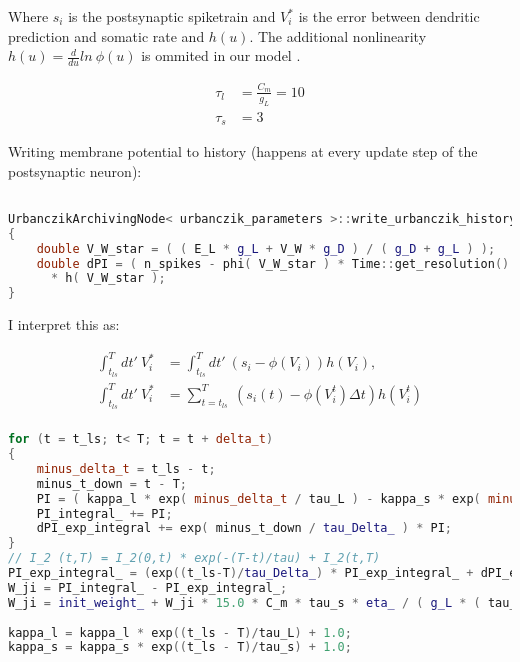 Where $s_i$ is the postsynaptic spiketrain and $V_i^*$ is the error between dendritic prediction and somatic rate and $h( u )$. The additional nonlinearity $h( u ) = \frac{d}{du} ln \  \phi(u)$ is ommited in our model .



\begin{align}
  \tau_l & = \frac{C_m}{g_L} = 10 \\
  \tau_s & = 3
\end{align}

Writing membrane potential to history (happens at every update step of the postsynaptic neuron):

\begin{lstlisting}[language=C++, directivestyle={\color{black}}
                   emph={int,char,double,float,unsigned,exp},
                   emphstyle={\color{blue}}]

UrbanczikArchivingNode< urbanczik_parameters >::write_urbanczik_history(Time t, double V_W, int n_spikes, int comp)
{
	double V_W_star = ( ( E_L * g_L + V_W * g_D ) / ( g_D + g_L ) );
	double dPI = ( n_spikes - phi( V_W_star ) * Time::get_resolution().get_ms() )
      * h( V_W_star );
}\end{lstlisting}

I interpret this as:


\begin{align}
  \int_{t_{ls}}^T dt' \ V_i^* & = \int_{t_{ls}}^T dt' \  (s_i - \phi(V_i )) h(V_i),               \\
  \int_{t_{ls}}^T dt' \ V_i^* & = \sum_{t=t_{ls}}^T \  (s_i(t) -  \phi(V_i^t ) \Delta t) h(V_i^t) \\
\end{align}

\begin{lstlisting}[language=C++, directivestyle={\color{black}}
                   emph={int,char,double,float,unsigned,exp},
                   emphstyle={\color{blue}}]
for (t = t_ls; t< T; t = t + delta_t)
{
   	minus_delta_t = t_ls - t;
    minus_t_down = t - T;
    PI = ( kappa_l * exp( minus_delta_t / tau_L ) - kappa_s * exp( minus_delta_t / tau_s ) ) * V_star(t);
    PI_integral_ += PI;
    dPI_exp_integral += exp( minus_t_down / tau_Delta_ ) * PI;
}  
// I_2 (t,T) = I_2(0,t) * exp(-(T-t)/tau) + I_2(t,T)
PI_exp_integral_ = (exp((t_ls-T)/tau_Delta_) * PI_exp_integral_ + dPI_exp_integral);
W_ji = PI_integral_ - PI_exp_integral_;
W_ji = init_weight_ + W_ji * 15.0 * C_m * tau_s * eta_ / ( g_L * ( tau_L - tau_s ) );    
  
kappa_l = kappa_l * exp((t_ls - T)/tau_L) + 1.0;
kappa_s = kappa_s * exp((t_ls - T)/tau_s) + 1.0;
  \end{lstlisting}


